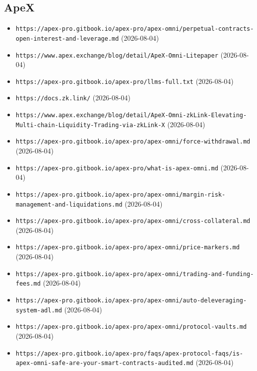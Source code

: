 \subsection*{ApeX}
\begin{itemize}\setlength{\itemsep}{0pt}\small
\item \texttt{https://apex-pro.gitbook.io/apex-pro/apex-omni/perpetual-contracts-open-interest-and-leverage.md} (2026-08-04)
\item \texttt{https://www.apex.exchange/blog/detail/ApeX-Omni-Litepaper} (2026-08-04)
\item \texttt{https://apex-pro.gitbook.io/apex-pro/llms-full.txt} (2026-08-04)
\item \texttt{https://docs.zk.link/} (2026-08-04)
\item \texttt{https://www.apex.exchange/blog/detail/ApeX-Omni-zkLink-Elevating-Multi-chain-Liquidity-Trading-via-zkLink-X} (2026-08-04)
\item \texttt{https://apex-pro.gitbook.io/apex-pro/apex-omni/force-withdrawal.md} (2026-08-04)
\item \texttt{https://apex-pro.gitbook.io/apex-pro/what-is-apex-omni.md} (2026-08-04)
\item \texttt{https://apex-pro.gitbook.io/apex-pro/apex-omni/margin-risk-management-and-liquidations.md} (2026-08-04)
\item \texttt{https://apex-pro.gitbook.io/apex-pro/apex-omni/cross-collateral.md} (2026-08-04)
\item \texttt{https://apex-pro.gitbook.io/apex-pro/apex-omni/price-markers.md} (2026-08-04)
\item \texttt{https://apex-pro.gitbook.io/apex-pro/apex-omni/trading-and-funding-fees.md} (2026-08-04)
\item \texttt{https://apex-pro.gitbook.io/apex-pro/apex-omni/auto-deleveraging-system-adl.md} (2026-08-04)
\item \texttt{https://apex-pro.gitbook.io/apex-pro/apex-omni/protocol-vaults.md} (2026-08-04)
\item \texttt{https://apex-pro.gitbook.io/apex-pro/faqs/apex-protocol-faqs/is-apex-omni-safe-are-your-smart-contracts-audited.md} (2026-08-04)
\end{itemize}

